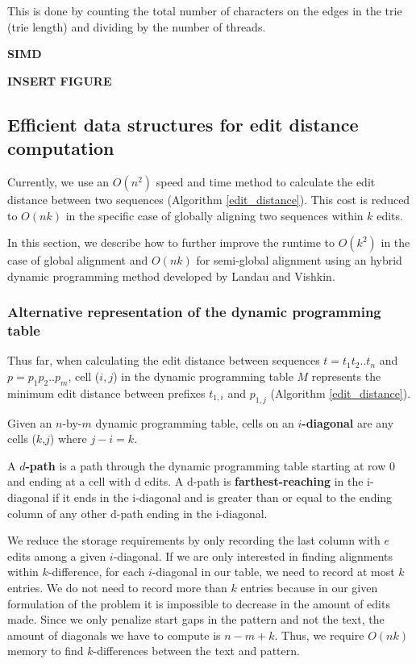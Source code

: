 This is done by counting the total number of characters on the edges in the trie (trie length) and dividing by the number of threads.

{\bf SIMD}

{\bf INSERT FIGURE}


\subsection{Efficient data structures for edit distance computation}

Currently, we use an $O(n^2)$ speed and time method to calculate the edit distance between two sequences (Algorithm \ref{edit_distance}).
This cost is reduced to $O(nk)$ in the specific case of globally aligning two sequences within $k$ edits.

In this section, we describe how to further improve the runtime to $O(k^2)$ in the case of global alignment and $O(nk)$ for semi-global alignment using an hybrid dynamic programming method developed by Landau and Vishkin\cite{landau_introducing_1986}.

\subsubsection{Alternative representation of the dynamic programming table}

Thus far, when calculating the edit distance between sequences $t = t_1 t_2 .. t_n$ and $p = p_1 p_2 .. p_m$, cell ($i,j$) in the dynamic programming table $M$ represents the minimum edit distance between prefixes $t_{1,i}$ and $p_{1,j}$ (Algorithm \ref{edit_distance}).

\begin{definition}
Given an $n$-by-$m$ dynamic programming table, cells on an {\bf $i$-diagonal} are any cells ($k$,$j$) where $j-i=k$.
\end{definition}

\begin{definition}
A {\bf $d$-path} is a path through the dynamic programming table starting at row 0 and ending at a cell with d edits.  A d-path is {\bf farthest-reaching} in the i-diagonal if it ends in the i-diagonal and is greater than or equal to the ending column of any other d-path ending in the i-diagonal.
\end{definition}

We reduce the storage requirements by only recording the last column with $e$ edits among a given $i$-diagonal.
If we are only interested in finding alignments within $k$-difference, for each $i$-diagonal in our table, we need to record at most $k$ entries.
We do not need to record more than $k$ entries because in our given formulation of the problem it is impossible to decrease in the amount of edits made.
Since we only penalize start gaps in the pattern and not the text, the amount of diagonals we have to compute is $n - m + k$.
Thus, we require $O(nk)$ memory to find $k$-differences between the text and pattern.

